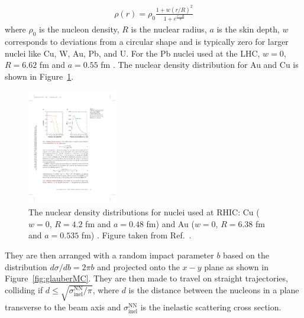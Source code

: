 \begin{align}
\rho(r) = \rho_0 \frac{1 + w (r/R)^2}{1+e^{\frac{r-R}{a}}}
\end{align}
where $\rho_0$ is the nucleon density, $R$ is the nuclear radius, $a$ is the skin depth, $w$ corresponds to deviations from a circular shape and is typically zero for larger nuclei like Cu, W, Au, Pb, and U.
For the Pb nuclei used at the LHC, $w = 0$, $R = 6.62$ fm and $a =0.55$ fm \cite{DEVRIES1987495}.
The nuclear density distribution for Au and Cu is shown in Figure~\ref{fig:nuclearDensity}.

\begin{figure}[htbp]
\begin{center}
\includegraphics[width=0.35\textwidth]{figures/theory/nuclearDensity}
\caption{ The nuclear density distributions for nuclei used at RHIC: Cu ($w = 0$, $R = 4.2$ fm and $a =0.48$ fm)  and Au ($w = 0$, $R = 6.38$ fm and $a =0.535$ fm) \cite{DEVRIES1987495}.
Figure taken from Ref.~\cite{doi:10.1146/annurev.nucl.57.090506.123020}.}
\label{fig:nuclearDensity}
\end{center}
\end{figure}

They are then arranged with a random impact parameter $b$ based on the distribution $d\sigma/d b = 2\pi b$ and projected onto the $x-y$ plane as shown in Figure~\ref{fig:glauberMC}.
They are then made to travel on straight trajectories, colliding if $d \leq \sqrt{\sigma_{\mathrm{inel}}^{\mathrm{NN}}/ \pi}$, where $d$ is the distance between the nucleons in a plane transverse to the beam axis and $\sigma_{\mathrm{inel}}^{\mathrm{NN}}$ is the inelastic scattering cross section. \cite{doi:10.1146/annurev.nucl.57.090506.123020, Alver:2008aq}

